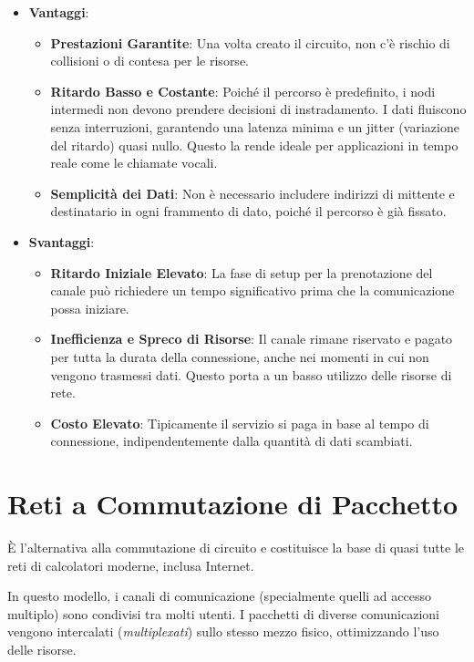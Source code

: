 \begin{itemize}
    \item \textbf{Vantaggi}:
    \begin{itemize}
        \item \textbf{Prestazioni Garantite}: Una volta creato il circuito, non c'è rischio di collisioni o di contesa per le risorse.
        \item \textbf{Ritardo Basso e Costante}: Poiché il percorso è predefinito, i nodi intermedi non devono prendere decisioni di instradamento. I dati fluiscono senza interruzioni, garantendo una latenza minima e un jitter (variazione del ritardo) quasi nullo. Questo la rende ideale per applicazioni in tempo reale come le chiamate vocali.
        \item \textbf{Semplicità dei Dati}: Non è necessario includere indirizzi di mittente e destinatario in ogni frammento di dato, poiché il percorso è già fissato.
    \end{itemize}
    \item \textbf{Svantaggi}:
    \begin{itemize}
        \item \textbf{Ritardo Iniziale Elevato}: La fase di setup per la prenotazione del canale può richiedere un tempo significativo prima che la comunicazione possa iniziare.
        \item \textbf{Inefficienza e Spreco di Risorse}: Il canale rimane riservato e pagato per tutta la durata della connessione, anche nei momenti in cui non vengono trasmessi dati. Questo porta a un basso utilizzo delle risorse di rete.
        \item \textbf{Costo Elevato}: Tipicamente il servizio si paga in base al tempo di connessione, indipendentemente dalla quantità di dati scambiati.
    \end{itemize}
\end{itemize}

\section{Reti a Commutazione di Pacchetto}
È l'alternativa alla commutazione di circuito e costituisce la base di quasi tutte le reti di calcolatori moderne, inclusa Internet.

In questo modello, i canali di comunicazione (specialmente quelli ad accesso multiplo) sono condivisi tra molti utenti. I pacchetti di diverse comunicazioni vengono intercalati (\textit{multiplexati}) sullo stesso mezzo fisico, ottimizzando l'uso delle risorse.

